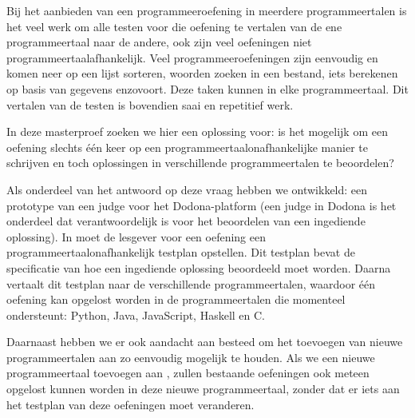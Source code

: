 Bij het aanbieden van een programmeeroefening in meerdere programmeertalen is het veel werk om alle testen voor die oefening te vertalen van de ene programmeertaal naar de andere, ook zijn veel oefeningen niet programmeertaalafhankelijk.
Veel programmeeroefeningen zijn eenvoudig en komen neer op een lijst sorteren, woorden zoeken in een bestand, iets berekenen op basis van gegevens enzovoort.
Deze taken kunnen in elke programmeertaal.
Dit vertalen van de testen is bovendien saai en repetitief werk.

In deze masterproef zoeken we hier een oplossing voor: is het mogelijk om een oefening slechts één keer op een programmeertaalonafhankelijke manier te schrijven en toch oplossingen in verschillende programmeertalen te beoordelen?

Als onderdeel van het antwoord op deze vraag hebben we \tested{} ontwikkeld: een prototype van een judge voor het Dodona-platform (een judge in Dodona is het onderdeel dat verantwoordelijk is voor het beoordelen van een ingediende oplossing).
In \tested{} moet de lesgever voor een oefening een programmeertaalonafhankelijk testplan opstellen.
Dit testplan bevat de specificatie van hoe een ingediende oplossing beoordeeld moet worden.
Daarna vertaalt \tested{} dit testplan naar de verschillende programmeertalen, waardoor één oefening kan opgelost worden in de programmeertalen die \tested{} momenteel ondersteunt: Python, Java, JavaScript, Haskell en C.\@

Daarnaast hebben we er ook aandacht aan besteed om het toevoegen van nieuwe programmeertalen aan \tested{} zo eenvoudig mogelijk te houden.
Als we een nieuwe programmeertaal toevoegen aan \tested{}, zullen bestaande oefeningen ook meteen opgelost kunnen worden in deze nieuwe programmeertaal, zonder dat er iets aan het testplan van deze oefeningen moet veranderen.